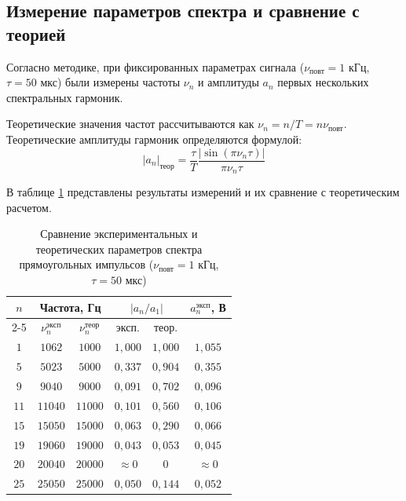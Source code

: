 \documentclass[a4paper,10pt]{article}
\begin{document}
\subsection*{ Измерение параметров спектра и сравнение с теорией}

Согласно методике, при фиксированных параметрах сигнала (\(\nu_{\text{повт}} = 1\) кГц, \(\tau = 50\) мкс) были измерены частоты \(\nu_n\) и амплитуды \(a_n\) первых нескольких спектральных гармоник. 

Теоретические значения частот рассчитываются как \(\nu_n = n/T = n\nu_{\text{повт}}\). Теоретические амплитуды гармоник определяются формулой:
\begin{equation}
|a_n|_{\text{теор}} = \frac{\tau}{T} \frac{\left|\sin(\pi \nu_n \tau)\right|}{\pi \nu_n \tau}
\end{equation}

В таблице \ref{tab:harmonics} представлены результаты измерений и их сравнение с теоретическим расчетом.

\begin{table}[htbp]
    \centering
    \caption{Сравнение экспериментальных и теоретических параметров спектра прямоугольных импульсов (\(\nu_{\text{повт}} = 1\) кГц, \(\tau = 50\) мкс)}
    \label{tab:harmonics}
    \begin{tabular}{|c|c|c|c|c|c|}
        \hline
        \multirow{2}{*}{\(n\)} & \multicolumn{2}{c|}{Частота, Гц} & \multicolumn{2}{c|}{\(|a_n/a_1|\)} & \(a_n^{\text{эксп}}\), В \\
        \cline{2-5}
        & \(\nu_n^{\text{эксп}}\) & \(\nu_n^{\text{теор}}\) & эксп. & теор. & \\
        \hline
        \(1\)  & \(1062\) & \(1000\) & \(1,000\) & \(1,000\) & \(1,055\) \\
        \(5\)  & \(5023\) & \(5000\) & \(0,337\) & \(0,904\) & \(0,355\) \\
        \(9\)  & \(9040\) & \(9000\) & \(0,091\) & \(0,702\) & \(0,096\) \\
        \(11\) & \(11040\) & \(11000\) & \(0,101\) & \(0,560\) & \(0,106\) \\
        \(15\) & \(15050\) & \(15000\) & \(0,063\) & \(0,290\) & \(0,066\) \\
        \(19\) & \(19060\) & \(19000\) & \(0,043\) & \(0,053\) & \(0,045\) \\
        \(20\) & \(20040\) & \(20000\) & \(\approx 0\) & \(0\) & \(\approx 0\) \\
        \(25\) & \(25050\) & \(25000\) & \(0,050\) & \(0,144\) & \(0,052\) \\
        \hline
    \end{tabular}
\end{table}
\end{document}
